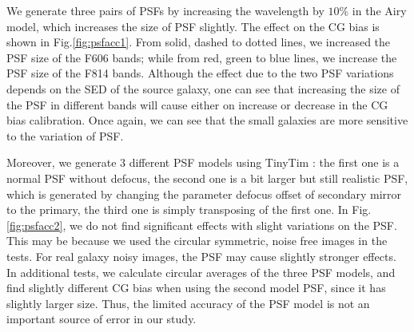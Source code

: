 \documentclass[useAMS,usenatbib]{mn2e}
\begin{document}
We generate three pairs of PSFs by increasing the wavelength by $10\%$ in the
Airy model, which increases the size of PSF slightly. The
effect on the CG bias is shown in Fig.\ref{fig:psfacc1}. From solid,
dashed to dotted lines, we increased the PSF size of the F606 bands; while
from red, green to blue lines, we increase the PSF size of the F814
bands. Although the effect due to the two PSF variations depends on the
SED of the source galaxy, one can see that increasing the size of the
PSF in different bands will cause either on increase or
decrease in the CG bias calibration. Once again, we can see that
the small galaxies are more sensitive to the variation of PSF.

Moreover, we generate 3 different PSF models using TinyTim
\citep{2011SPIE.8127E..0JK}: the first one is a normal PSF without
defocus, the second one is a bit larger but still realistic PSF, which
is generated by changing the parameter defocus offset of secondary
mirror to the primary, the third one is simply transposing of the
first one.  In Fig.\ref{fig:psfacc2}, we do not find significant
effects with slight variations on the PSF. This may be because we used
the circular symmetric, noise free images in the tests. For real
galaxy noisy images, the PSF may cause slightly stronger effects. In
additional tests, we calculate circular averages of the three PSF
models, and find slightly different CG bias when using the second
model PSF, since it has slightly larger size. Thus, the limited
accuracy of the PSF model is not an important source of error in our
study.
\end{document}
